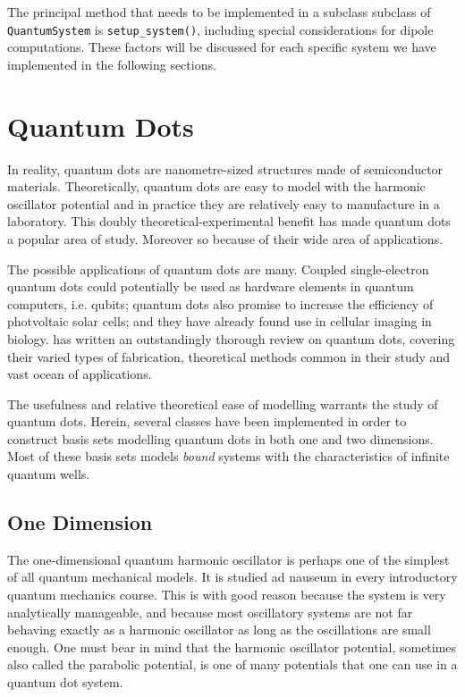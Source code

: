 The principal method that needs to be implemented in a subclass subclass of
\lstinline{QuantumSystem} is
\lstinline{setup_system()}, including special considerations for dipole computations.
These factors will be discussed for each specific system we have implemented in the 
following sections.

\section{Quantum Dots}

In reality, quantum dots are nanometre-sized structures made of semiconductor materials.
Theoretically, quantum dots are easy to model with the harmonic oscillator potential and 
in practice
they are relatively easy to manufacture in a laboratory. This doubly
theoretical-experimental benefit has made quantum dots a popular area of study. Moreover so 
because of their wide area of applications.

The possible applications of quantum dots are many. Coupled single-electron quantum dots 
could potentially be used as hardware elements in quantum computers, i.e.
qubits\cite{loss1998quantum}; quantum dots also promise to increase the efficiency of 
photvoltaic solar cells; and they have already found use in cellular imaging in biology.
\citeauthor{reimann2002electronic}\cite{reimann2002electronic} has written an outstandingly
thorough review on quantum dots, covering their varied types of fabrication, theoretical
methods common in their study and vast ocean of applications.

The usefulness and relative theoretical ease of modelling warrants the study of quantum dots.
Herein, several classes have been implemented in order to construct basis sets modelling 
quantum dots in both one and two dimensions. Most of these basis sets models \emph{bound} systems
with the characteristics of infinite quantum wells. 

\subsection{One Dimension}

The one-dimensional quantum harmonic oscillator is perhaps one of the simplest of
all quantum mechanical models. It is studied ad nauseum in every introductory quantum 
mechanics course. This is with good reason because the system is very analytically 
manageable, and because most oscillatory systems are not far behaving exactly as a
harmonic oscillator as long as the oscillations are small enough. One must bear in 
mind that the harmonic oscillator potential, sometimes also called the parabolic potential, 
is one of many potentials that one can use in a quantum dot system.

